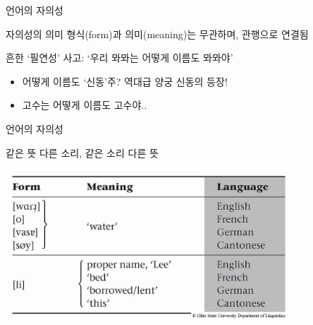 \documentclass[11pt, aspectratio=169]{beamer}
\begin{document}
\begin{frame}[t]{언어의 자의성}
  \begin{center}
  \end{center}

\begin{block}{자의성의 의미}
형식(form)과 의미(meaning)는 무관하며, 관행으로 연결됨  
\end{block}
흔한 ‘필연성’ 사고: ‘우리 뫄뫄는 어떻게 이름도 뫄뫄야’ 
\begin{itemize}
  \item 어떻게 이름도 ‘신동’주? 역대급 양궁 신동의 등장! 
  \item 고수는 어떻게 이름도 고수야..
\end{itemize}
\end{frame}

\begin{frame}[t]{언어의 자의성}
  \begin{block}{같은 뜻 다른 소리, 같은 소리 다른 뜻}
    \begin{center}
      \includegraphics[width=0.8\textwidth]{img/form-meaning.jpg}        
    \end{center}
  \end{block}
\end{frame}
\end{document}
